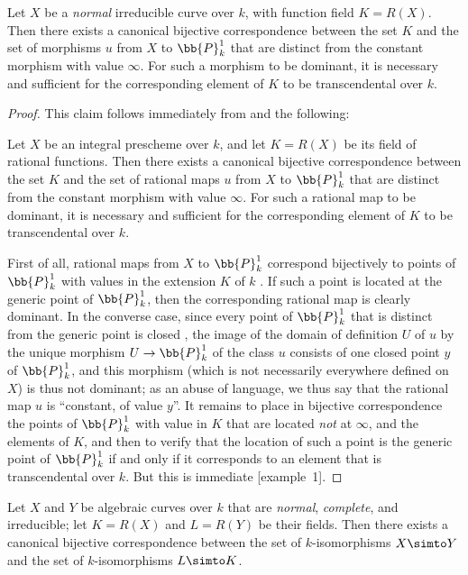 \begin{corollary}[7.4.15]
\label{II.7.4.15}
Let $X$ be a \emph{normal} irreducible curve over $k$, with function field $K=R(X)$.
Then there exists a canonical bijective correspondence between the set $K$ and the set of morphisms $u$ from $X$ to $\bb{P}_k^1$ that are distinct from the constant morphism with value $\infty$.
For such a morphism to be dominant, it is necessary and sufficient for the corresponding element of $K$ to be transcendental over $k$.
\end{corollary}

\begin{proof}
This claim follows immediately from  and the following:
\begin{lemma}[7.4.15.1]
\label{II.7.4.15.1}
Let $X$ be an integral prescheme over $k$, and let $K=R(X)$ be its field of rational functions.
Then there exists a canonical bijective correspondence between the set $K$ and the set of rational maps $u$ from $X$ to $\bb{P}_k^1$ that are distinct from the constant morphism with value $\infty$.
For such a rational map to be dominant, it is necessary and sufficient for the corresponding element of $K$ to be transcendental over $k$.
\end{lemma}
First of all, rational maps from $X$ to $\bb{P}_k^1$ correspond bijectively to points of $\bb{P}_k^1$ with values in the extension $K$ of $k$ .
If such a point is located  at the generic point of $\bb{P}_k^1$, then the corresponding rational map is clearly dominant.
In the converse case, since every point of $\bb{P}_k^1$ that is distinct from the generic point is closed , the image of the domain of definition $U$ of $u$ by the unique morphism $U\to\bb{P}_k^1$ of the class $u$  consists of one closed point $y$ of $\bb{P}_k^1$, and this morphism (which is not necessarily everywhere defined on $X$) is thus not dominant;
as an abuse of language, we thus say that the rational map $u$ is ``constant, of value $y$''.
It remains to place in bijective correspondence the points of $\bb{P}_k^1$ with value in $K$ that are located  \emph{not} at $\infty$, and the elements of $K$, and then to verify that the location of such a point is the generic point of $\bb{P}_k^1$ if and only if it corresponds to an
element that is transcendental over $k$.
But this is immediate [example~1].
\end{proof}

\begin{corollary}[7.4.16]
\label{II.7.4.16}
Let $X$ and $Y$ be algebraic curves over $k$ that are \emph{normal}, \emph{complete}, and irreducible;
let $K=R(X)$ and $L=R(Y)$ be their fields.
Then there exists a canonical bijective correspondence between the set of $k$-isomorphisms $X\simto Y$ and the set of $k$-isomorphisms $L\simto K$.
\end{corollary}


